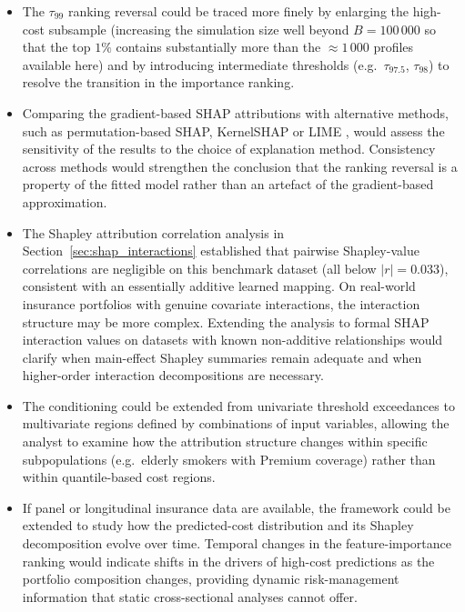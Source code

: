 \begin{itemize}
    \item The $\tau_{99}$ ranking reversal could be traced more finely by
          enlarging the high-cost subsample (increasing the simulation size
          well beyond $B = 100\,000$ so that the top $1\%$ contains
          substantially more than the ${\approx}1\,000$ profiles available
          here) and by introducing intermediate thresholds (e.g.\
          $\tau_{97.5}$, $\tau_{98}$) to resolve the transition in the
          importance ranking.

    \item Comparing the gradient-based SHAP attributions with alternative
          methods, such as permutation-based SHAP, KernelSHAP or LIME
          \citep{ribeiro2016should}, would assess the sensitivity of the
          results to the choice of explanation method.  Consistency across
          methods would strengthen the conclusion that the ranking
          reversal is a property of the fitted model rather than an
          artefact of the gradient-based approximation.

    \item The Shapley attribution correlation analysis in
          Section~\ref{sec:shap_interactions} established that pairwise
          Shapley-value correlations are negligible on this benchmark
          dataset (all below $|r| = 0.033$), consistent with an essentially
          additive learned mapping.  On real-world insurance portfolios
          with genuine covariate interactions, the interaction structure
          may be more complex.  Extending the analysis to formal SHAP
          interaction values on datasets with known non-additive
          relationships would clarify
          when main-effect Shapley summaries remain adequate and when
          higher-order interaction decompositions are necessary.

    \item The conditioning could be extended from univariate threshold
          exceedances to multivariate regions defined by combinations of
          input variables, allowing the analyst to examine how the
          attribution structure changes within specific subpopulations
          (e.g.\ elderly smokers with Premium coverage) rather than
          within quantile-based cost regions.

    \item If panel or longitudinal insurance data are available, the
          framework could be extended to study how the predicted-cost
          distribution and its Shapley decomposition evolve over time.
          Temporal changes in the feature-importance ranking would
          indicate shifts in the drivers of high-cost predictions as the
          portfolio composition changes, providing dynamic risk-management
          information that static cross-sectional analyses cannot offer.


\end{itemize}
